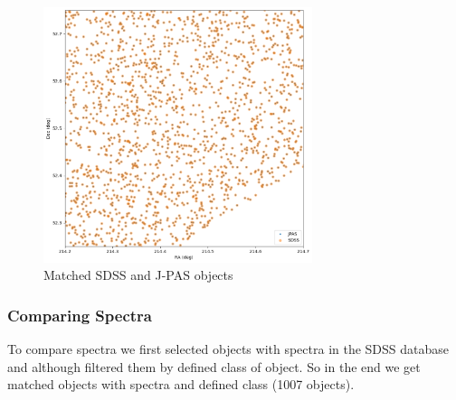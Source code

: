 \documentclass{beamer}
\begin{document}
\begin{frame}
\frametitle{}
    \begin{figure}
        \centering
        \includegraphics[width=0.7\textwidth]{../images/SDSS and J-PAS matched zoomed.png}
        \caption{Matched SDSS and J-PAS objects}
    \end{figure}
\end{frame}

\begin{frame}
\frametitle{Comparing Spectra}
    To compare spectra we first selected objects with spectra in the SDSS database and although filtered them by defined class of object.
    So in the end we get matched objects with spectra and defined class (1007 objects).
    \begin{center}
    \end{center}
\end{frame}
\end{document}
